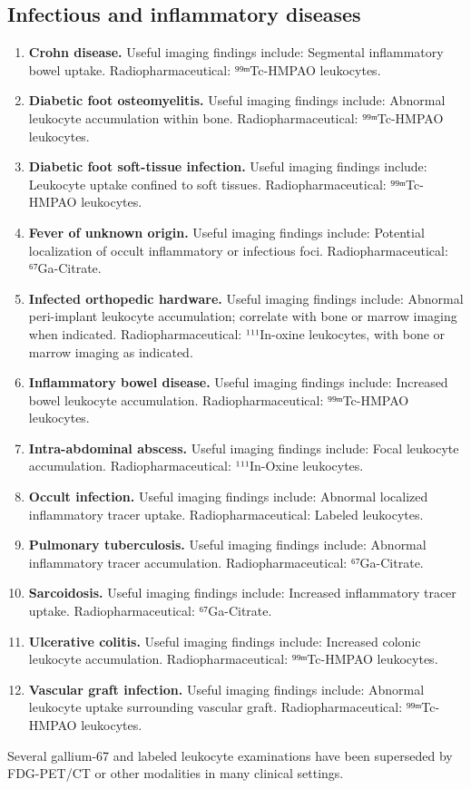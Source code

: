 \subsection{Infectious and inflammatory diseases}
\begin{enumerate}[leftmargin=*,itemsep=0.45em,topsep=0.4em]
\item \textbf{Crohn disease.} Useful imaging findings include: Segmental inflammatory bowel uptake. Radiopharmaceutical: ⁹⁹ᵐTc-HMPAO leukocytes.
\item \textbf{Diabetic foot osteomyelitis.} Useful imaging findings include: Abnormal leukocyte accumulation within bone. Radiopharmaceutical: ⁹⁹ᵐTc-HMPAO leukocytes.
\item \textbf{Diabetic foot soft-tissue infection.} Useful imaging findings include: Leukocyte uptake confined to soft tissues. Radiopharmaceutical: ⁹⁹ᵐTc-HMPAO leukocytes.
\item \textbf{Fever of unknown origin.} Useful imaging findings include: Potential localization of occult inflammatory or infectious foci. Radiopharmaceutical: ⁶⁷Ga-Citrate.
\item \textbf{Infected orthopedic hardware.} Useful imaging findings include: Abnormal peri-implant leukocyte accumulation; correlate with bone or marrow imaging when indicated. Radiopharmaceutical: ¹¹¹In-oxine leukocytes, with bone or marrow imaging as indicated.
\item \textbf{Inflammatory bowel disease.} Useful imaging findings include: Increased bowel leukocyte accumulation. Radiopharmaceutical: ⁹⁹ᵐTc-HMPAO leukocytes.
\item \textbf{Intra-abdominal abscess.} Useful imaging findings include: Focal leukocyte accumulation. Radiopharmaceutical: ¹¹¹In-Oxine leukocytes.
\item \textbf{Occult infection.} Useful imaging findings include: Abnormal localized inflammatory tracer uptake. Radiopharmaceutical: Labeled leukocytes.
\item \textbf{Pulmonary tuberculosis.} Useful imaging findings include: Abnormal inflammatory tracer accumulation. Radiopharmaceutical: ⁶⁷Ga-Citrate.
\item \textbf{Sarcoidosis.} Useful imaging findings include: Increased inflammatory tracer uptake. Radiopharmaceutical: ⁶⁷Ga-Citrate.
\item \textbf{Ulcerative colitis.} Useful imaging findings include: Increased colonic leukocyte accumulation. Radiopharmaceutical: ⁹⁹ᵐTc-HMPAO leukocytes.
\item \textbf{Vascular graft infection.} Useful imaging findings include: Abnormal leukocyte uptake surrounding vascular graft. Radiopharmaceutical: ⁹⁹ᵐTc-HMPAO leukocytes.
\end{enumerate}
Several gallium-67 and labeled leukocyte examinations have been superseded by FDG-PET/CT or other modalities in many clinical settings.

